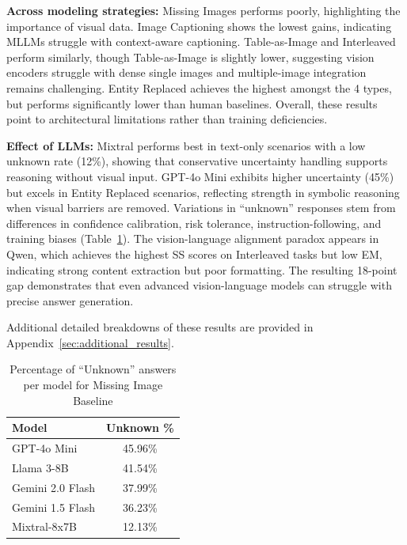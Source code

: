 \documentclass[11pt]{article}
\begin{document}
\textbf{Across modeling strategies:}
Missing Images performs poorly, highlighting the importance of visual data. Image Captioning shows the lowest gains, indicating MLLMs struggle with context-aware captioning. Table-as-Image and Interleaved perform similarly, though Table-as-Image is slightly lower, suggesting vision encoders struggle with dense single images and multiple-image integration remains challenging. Entity Replaced achieves the highest amongst the 4 types, but performs significantly lower than human baselines. Overall, these results point to architectural limitations rather than training deficiencies.



\noindent
\textbf{Effect of LLMs:}
Mixtral performs best in text-only scenarios with a low unknown rate (12\%), showing that conservative uncertainty handling supports reasoning without visual input. GPT-4o Mini exhibits higher uncertainty (45\%) but excels in Entity Replaced scenarios, reflecting strength in symbolic reasoning when visual barriers are removed. Variations in “unknown” responses stem from differences in confidence calibration, risk tolerance, instruction-following, and training biases (Table~\ref{tab:unknown}). The vision-language alignment paradox appears in Qwen, which achieves the highest SS scores on Interleaved tasks but low EM, indicating strong content extraction but poor formatting. The resulting 18-point gap demonstrates that even advanced vision-language models can struggle with precise answer generation.


Additional detailed breakdowns of these results are provided in Appendix~\ref{sec:additional_results}.

\begin{table}[H]
\centering
\setlength{\aboverulesep}{0pt}
\setlength{\belowrulesep}{0pt}
\small
\setlength{\tabcolsep}{12pt}
\begin{tabular}{lc}
\toprule
\textbf{Model} & \textbf{Unknown \%} \\
\midrule
GPT-4o Mini       & 45.96\% \\
Llama 3-8B        & 41.54\% \\
Gemini 2.0 Flash  & 37.99\% \\
Gemini 1.5 Flash  & 36.23\% \\
Mixtral-8x7B      & 12.13\% \\
\bottomrule
\end{tabular}
\caption{\small Percentage of ``Unknown'' answers per model for Missing Image Baseline}
\label{tab:unknown}
\end{table}
\end{document}
